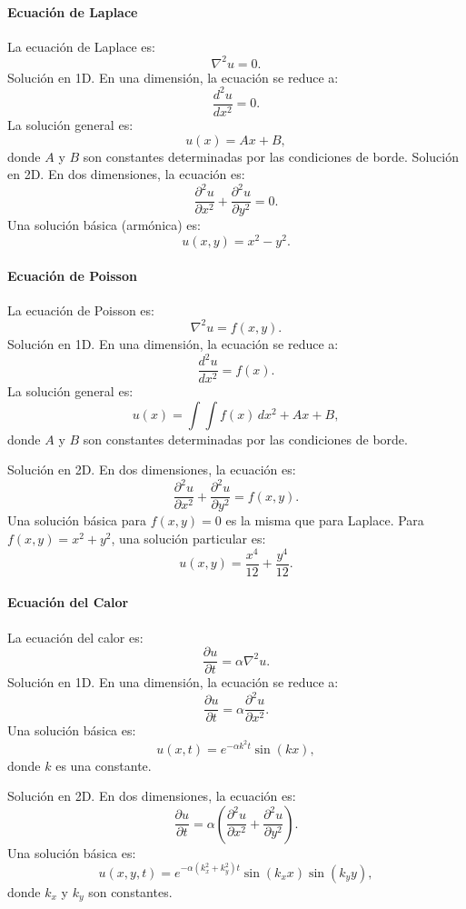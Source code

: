 \documentclass[11pt]{book}
\theoremstyle{definicion}
\theoremstyle{teorema}
\theoremstyle{ejemplo}
\begin{document}
\paragraph{Ecuación de Laplace}
La ecuación de Laplace es:
\[
\nabla^2 u = 0.
\]
Solución en 1D.
En una dimensión, la ecuación se reduce a:
\[
\frac{d^2 u}{dx^2} = 0.
\]
La solución general es:
\[
u(x) = Ax + B,
\]
donde \(A\) y \(B\) son constantes determinadas por las condiciones de borde.
Solución en 2D.
En dos dimensiones, la ecuación es:
\[
\frac{\partial^2 u}{\partial x^2} + \frac{\partial^2 u}{\partial y^2} = 0.
\]
Una solución básica (armónica) es:
\[
u(x, y) = x^2 - y^2.
\]

\paragraph{Ecuación de Poisson}
La ecuación de Poisson es:
\[
\nabla^2 u = f(x, y).
\]
Solución en 1D.
En una dimensión, la ecuación se reduce a:
\[
\frac{d^2 u}{dx^2} = f(x).
\]
La solución general es:
\[
u(x) = \int \int f(x) \, dx^2 + Ax + B,
\]
donde \(A\) y \(B\) son constantes determinadas por las condiciones de borde.

\medskip

\noindent
Solución en 2D.
En dos dimensiones, la ecuación es:
\[
\frac{\partial^2 u}{\partial x^2} + \frac{\partial^2 u}{\partial y^2} = f(x, y).
\]
Una solución básica para \(f(x, y) = 0\) es la misma que para Laplace. Para \(f(x, y) = x^2 + y^2\), una solución particular es:
\[
u(x, y) = \frac{x^4}{12} + \frac{y^4}{12}.
\]

\paragraph{Ecuación del Calor}
La ecuación del calor es:
\[
\frac{\partial u}{\partial t} = \alpha \nabla^2 u.
\]
Solución en 1D.
En una dimensión, la ecuación se reduce a:
\[
\frac{\partial u}{\partial t} = \alpha \frac{\partial^2 u}{\partial x^2}.
\]
Una solución básica es:
\[
u(x, t) = e^{-\alpha k^2 t} \sin(kx),
\]
donde \(k\) es una constante.

\medskip

\noindent
Solución en 2D.
En dos dimensiones, la ecuación es:
\[
\frac{\partial u}{\partial t} = \alpha \left( \frac{\partial^2 u}{\partial x^2} + \frac{\partial^2 u}{\partial y^2} \right).
\]
Una solución básica es:
\[
u(x, y, t) = e^{-\alpha (k_x^2 + k_y^2) t} \sin(k_x x) \sin(k_y y),
\]
donde \(k_x\) y \(k_y\) son constantes.
\end{document}
